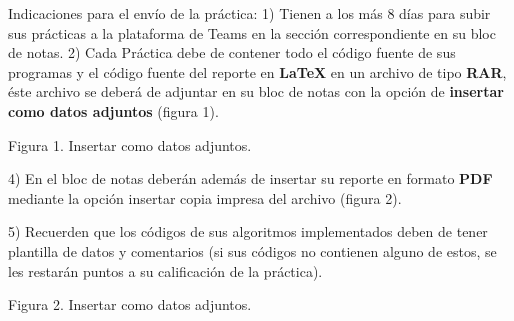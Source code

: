 \documentclass[12pt,twoside]{article}
\begin{document}
Indicaciones para el env\'io de la pr\'actica: 1) Tienen a los m\'as 8 d\'ias para subir sus pr\'acticas a la plataforma de Teams en la secci\'on correspondiente en su bloc de notas. 2) Cada Pr\'actica debe de contener todo el c\'odigo fuente de sus programas y el c\'odigo fuente del reporte en \textbf{LaTeX} en un archivo de tipo \textbf{RAR}, \'este archivo se deber\'a de adjuntar en su bloc de notas con la opci\'on de \textbf{insertar como datos adjuntos} (figura 1).

\newpage

\medskip

\begin{figure}[h]
\vspace{3cm} \hspace{-2cm} \setlength{\unitlength}{1mm}

\end{figure}
\vspace{-1cm}
\begin{center}
Figura 1. Insertar como datos adjuntos.
\end{center}
\medskip

\vspace{0cm}

4) En el bloc de notas deber\'an adem\'as de insertar su reporte en formato \textbf{PDF} mediante la opci\'on insertar copia impresa del archivo (figura 2).

\medskip

5) Recuerden que los c\'odigos de sus algoritmos implementados deben de tener plantilla de datos y comentarios (si sus c\'odigos no contienen alguno de estos, se les restar\'an puntos a su calificaci\'on de la pr\'actica).


\medskip

\begin{figure}[h]
\vspace{3cm} \hspace{-2cm} \setlength{\unitlength}{1mm}

\end{figure}
\vspace{-1cm}
\begin{center}
Figura 2. Insertar como datos adjuntos.
\end{center}
\medskip
\end{document}
